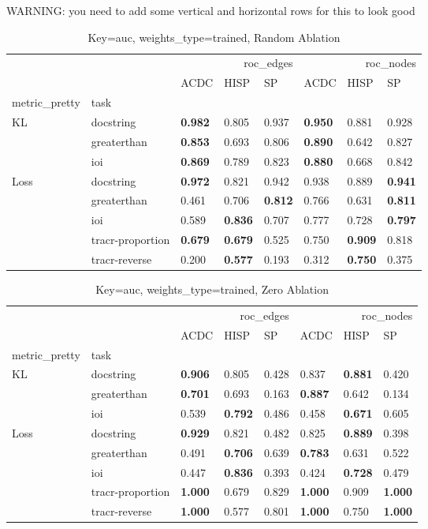 \documentclass{article}
\begin{document}
WARNING: you need to add some vertical and horizontal rows for this to look good

\begin{table}
\caption{Key=auc, weights\_type=trained, Random Ablation}
\begin{tabular}{llllllll}
\toprule
 &  & \multicolumn{3}{r}{roc\_edges} & \multicolumn{3}{r}{roc\_nodes} \\
 &  & ACDC & HISP & SP & ACDC & HISP & SP \\
metric\_pretty & task &  &  &  &  &  &  \\
\midrule
\multirow[c]{3}{*}{KL} & docstring & \textbf{0.982} & 0.805 & 0.937 & \textbf{0.950} & 0.881 & 0.928 \\
 & greaterthan & \textbf{0.853} & 0.693 & 0.806 & \textbf{0.890} & 0.642 & 0.827 \\
 & ioi & \textbf{0.869} & 0.789 & 0.823 & \textbf{0.880} & 0.668 & 0.842 \\
\multirow[c]{5}{*}{Loss} & docstring & \textbf{0.972} & 0.821 & 0.942 & 0.938 & 0.889 & \textbf{0.941} \\
 & greaterthan & 0.461 & 0.706 & \textbf{0.812} & 0.766 & 0.631 & \textbf{0.811} \\
 & ioi & 0.589 & \textbf{0.836} & 0.707 & 0.777 & 0.728 & \textbf{0.797} \\
 & tracr-proportion & \textbf{0.679} & \textbf{0.679} & 0.525 & 0.750 & \textbf{0.909} & 0.818 \\
 & tracr-reverse & 0.200 & \textbf{0.577} & 0.193 & 0.312 & \textbf{0.750} & 0.375 \\
\bottomrule
\end{tabular}
\end{table}
\begin{table}
\caption{Key=auc, weights\_type=trained, Zero Ablation}
\begin{tabular}{llllllll}
\toprule
 &  & \multicolumn{3}{r}{roc\_edges} & \multicolumn{3}{r}{roc\_nodes} \\
 &  & ACDC & HISP & SP & ACDC & HISP & SP \\
metric\_pretty & task &  &  &  &  &  &  \\
\midrule
\multirow[c]{3}{*}{KL} & docstring & \textbf{0.906} & 0.805 & 0.428 & 0.837 & \textbf{0.881} & 0.420 \\
 & greaterthan & \textbf{0.701} & 0.693 & 0.163 & \textbf{0.887} & 0.642 & 0.134 \\
 & ioi & 0.539 & \textbf{0.792} & 0.486 & 0.458 & \textbf{0.671} & 0.605 \\
\multirow[c]{5}{*}{Loss} & docstring & \textbf{0.929} & 0.821 & 0.482 & 0.825 & \textbf{0.889} & 0.398 \\
 & greaterthan & 0.491 & \textbf{0.706} & 0.639 & \textbf{0.783} & 0.631 & 0.522 \\
 & ioi & 0.447 & \textbf{0.836} & 0.393 & 0.424 & \textbf{0.728} & 0.479 \\
 & tracr-proportion & \textbf{1.000} & 0.679 & 0.829 & \textbf{1.000} & 0.909 & \textbf{1.000} \\
 & tracr-reverse & \textbf{1.000} & 0.577 & 0.801 & \textbf{1.000} & 0.750 & \textbf{1.000} \\
\bottomrule
\end{tabular}
\end{table}
\end{document}
